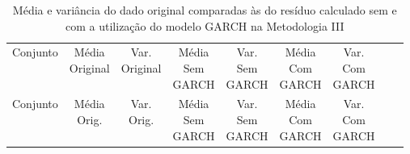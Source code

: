 \clearpage

\begin{center}
\begin{longtable}{ccccccccc}
\toprule
\rowcolor{white}
\caption[Metodologia III: dados estatísticos]{Média e variância do dado original
comparadas às do resíduo calculado sem e com a utilização do modelo GARCH na
Metodologia III} \label{tab:DadosEstatisticosMet3}\\
\midrule
    Conjunto & \specialcell{Média\\Original} &
    \specialcell{Var.\\Original} & \specialcell{Média\\Sem\\GARCH} &
    \specialcell{Var.\\Sem\\GARCH} & \specialcell{Média\\Com\\GARCH}&
    \specialcell{Var.\\Com\\GARCH} \\

\midrule
\endfirsthead 
\midrule
\rowcolor{white}
    Conjunto & \specialcell{Média\\Orig.} &
    \specialcell{Var.\\Orig.} & \specialcell{Média\\Sem\\GARCH} &
    \specialcell{Var.\\Sem\\GARCH} & \specialcell{Média\\Com\\GARCH}&
    \specialcell{Var.\\Com\\GARCH} \\


\end{longtable}
\end{center}
